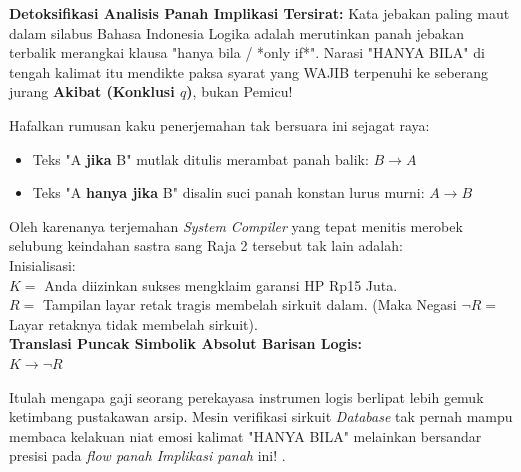 \textbf{Detoksifikasi Analisis Panah Implikasi Tersirat:}
Kata jebakan paling maut dalam silabus Bahasa Indonesia Logika adalah merutinkan panah jebakan terbalik merangkai klausa "hanya bila / *only if*". Narasi "HANYA BILA" di tengah kalimat itu mendikte paksa syarat yang WAJIB terpenuhi ke seberang jurang \textbf{Akibat (Konklusi $q$)}, bukan Pemicu! 

Hafalkan rumusan kaku penerjemahan tak bersuara ini sejagat raya:
\begin{itemize}
    \item Teks "A \textbf{jika} B" mutlak ditulis merambat panah balik: \textbf{$B \rightarrow A$}
    \item Teks "A \textbf{hanya jika} B" disalin suci panah konstan lurus murni: \textbf{$A \rightarrow B$}
\end{itemize}

Oleh karenanya terjemahan \textit{System Compiler} yang tepat menitis merobek selubung keindahan sastra sang Raja 2 tersebut tak lain adalah: \\
\indent Inisialisasi: \\
\indent\indent $K =$ Anda diizinkan sukses mengklaim garansi HP Rp15 Juta. \\
\indent\indent $R =$ Tampilan layar retak tragis membelah sirkuit dalam. (Maka Negasi $\neg R = $Layar retaknya tidak membelah sirkuit). \\
\textbf{Translasi Puncak Simbolik Absolut Barisan Logis:} \vspace{0.2cm} \\
\indent\indent\indent \textbf{$K \rightarrow \neg R$} 

Itulah mengapa gaji seorang perekayasa instrumen logis berlipat lebih gemuk ketimbang pustakawan arsip. Mesin verifikasi sirkuit \textit{Database} tak pernah mampu membaca kelakuan niat emosi kalimat "HANYA BILA" melainkan bersandar presisi pada \textit{flow panah Implikasi panah} ini! \cite{wiki_first_order_logic}.
